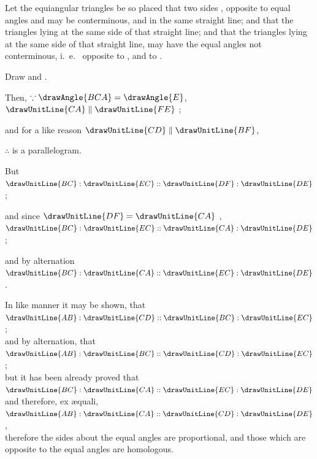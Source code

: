 \documentclass[booklanguage=english]{byrnebook}
\begin{document}
Let the equiangular triangles be so placed that two sides ,  opposite to equal angles  and  may be conterminous, and in the same straight line; and that the triangles lying at the same side of that straight line; and that the triangles lying at the same side of that straight line, may have the equal angles not conterminous, i.\ e.\  opposite to , and  to .

\begin{center}
Draw  and .

Then, $\because \drawAngle{BCA} = \drawAngle{E}$, $\drawUnitLine{CA} \parallel \drawUnitLine{FE}$ ; %

and for a like reason $\drawUnitLine{CD} \parallel \drawUnitLine{BF}$,

$\therefore$
is a parallelogram.

But $\drawUnitLine{BC} : \drawUnitLine{EC} :: \drawUnitLine{DF} : \drawUnitLine{DE}$ ;

and since $\drawUnitLine{DF} = \drawUnitLine{CA}$ ,\\
$\drawUnitLine{BC} : \drawUnitLine{EC} :: \drawUnitLine{CA} : \drawUnitLine{DE}$;

and by alternation $\drawUnitLine{BC} : \drawUnitLine{CA} :: \drawUnitLine{EC} : \drawUnitLine{DE}$ .

In like manner it may be shown, that\\
$\drawUnitLine{AB} : \drawUnitLine{CD} :: \drawUnitLine{BC} : \drawUnitLine{EC}$;\\
and by alternation, that\\
$\drawUnitLine{AB} : \drawUnitLine{BC} :: \drawUnitLine{CD} : \drawUnitLine{EC}$;\\
but it has been already proved that\\
$\drawUnitLine{BC} : \drawUnitLine{CA} :: \drawUnitLine{EC} : \drawUnitLine{DE}$\\
and therefore, ex æquali,\\
$\drawUnitLine{AB} : \drawUnitLine{CA} :: \drawUnitLine{CD} : \drawUnitLine{DE}$ ,\\
therefore the sides about the equal angles are proportional, and those which are opposite to the equal angles are homologous.
\end{center}
\end{document}
